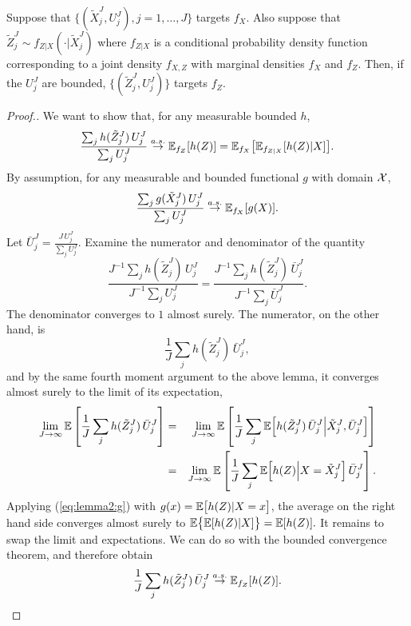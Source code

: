 \begin{lem}
    \label{lem:marginal-proper-weights}
    Suppose that $\{(\tilde X_j^J,U_j^J),j=1,\dots,J\}$ targets $f_X$. Also suppose that $\tilde Z_j^J \sim f_{Z|X}(\cdot | \tilde X_j^J)$ where $f_{Z|X}$ is a conditional probability density function corresponding to a joint density $f_{X,Z}$ with marginal densities $f_X$ and $f_Z$. Then, if the $U_j^J$ are bounded, $\{(\tilde Z_j^J,U_j^J)\}$ targets $f_Z$.
\end{lem}
\begin{proof}[Proof.]
    We want to show that, for any measurable bounded $h$, 
     \begin{equation}
     \frac{\sum_j h(\tilde Z_j^J) \, U_j^J}{\sum_j U_j^J} \stackrel{a.s.}{\to} \mathbb{E}_{f_Z}[h(Z)] = \mathbb{E}_{f_X}\big[\mathbb{E}_{f_{Z|X}}[h(Z) | X]\big].
     \end{equation}
    By assumption, for any measurable and bounded functional $g$ with domain ${\mathcal{X}}$,
    \begin{equation}\label{eq:lemma2:g}
    \frac{\sum_j g(\tilde X_j^J)\, U_j^J}{\sum_j U_j^J} \stackrel{a.s.}{\to} \mathbb{E}_{f_X}[g(X)].
    \end{equation}
    Let $\bar{U}_j^J = \frac{J \, U_j^J}{\sum_j U_j^J}$. Examine the numerator and denominator of the quantity \begin{equation}\frac{J^{-1}\sum_j h(\tilde Z_j^J) \, U_j^J}{J^{-1}\sum_j U_j^J} = \frac{J^{-1}\sum_j h(\tilde Z_j^J) \, \bar{U}_j^J}{J^{-1}\sum_j \bar{U}_j^J}.\end{equation}
    The denominator converges to $1$ almost surely. The numerator, on the other hand, is
    \begin{equation}
    \frac{1}{J}\sum_j h(\tilde Z_j^J)\, \bar{U}_j^J,
    \end{equation}
    and by the same fourth moment argument to the above lemma, it converges almost surely to the limit of its expectation,
    \begin{eqnarray}        
    \lim_{J\to\infty} \mathbb{E}\left[\frac{1}{J}\sum_j h(\tilde Z_j^J)\, \bar{U}_j^J\right] 
    &=& \lim_{J\to\infty} \mathbb{E} \left[\frac{1}{J}\sum_j  
      \mathbb{E}\Big[ h(\tilde Z_j^J)\, \bar{U}_j^J\Big|\tilde X_j^J, \bar U_j^J\Big]
    \right]
    \\
    &=& \lim_{J\to\infty} \mathbb{E} \left[\frac{1}{J}\sum_j  \mathbb{E}\Big[h(Z) \Big| X=\tilde X_j^J \Big] \, \bar U_j^J\right].
    \end{eqnarray}
    Applying (\ref{eq:lemma2:g}) with $g(x) = \mathbb{E}\big[h(Z) | X=x\big]$, the average on the right hand side converges almost surely to $\mathbb{E}\big\{\mathbb{E}[h(Z)|X]\big\}=\mathbb{E}[h(Z)].$
    It remains to swap the limit and expectations. We can do so with the bounded convergence theorem, and therefore obtain   
    \begin{equation}\frac{1}{J}\sum_j h(\tilde Z_j^J)\,\bar{U}_j^J \stackrel{a.s.}{\to} \mathbb{E}_{f_Z}[h(Z)].\end{equation} 
    \end{proof}

